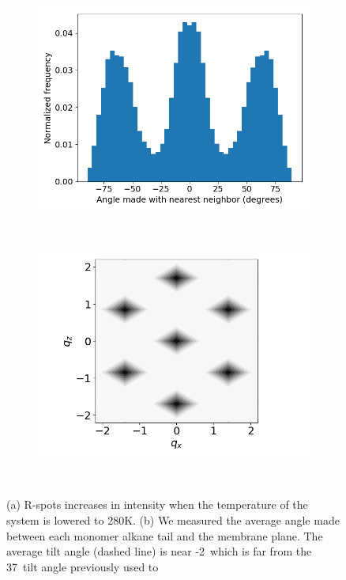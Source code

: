\documentclass[journal=jpcbfk,manuscript=article]{achemso}
\begin{document}
\begin{figure}[!htb]
\begin{subfigure}[t]{0.32\linewidth}
	        \includegraphics[width=\linewidth]{hexagonal_tail_packing.png}
	        \caption{}~\label{fig:layered_tails}
  \end{subfigure}
  \begin{subfigure}[t]{0.32\textwidth}
        	\centering
	        \includegraphics[width=\linewidth]{hexagonal_ft.png}  %
	        \caption{}~\label{fig:hexagonal_ft}
  \end{subfigure}
  \caption{(a) R-spots increases in intensity when the temperature of the system is 
      lowered to 280K. (b) We measured the average angle made between each monomer 
      alkane tail and the membrane plane. The average tilt angle (dashed line) is 
      near -2\degree~which is far from the 37\degree~tilt angle previously used to
}
\end{figure}
\end{document}

